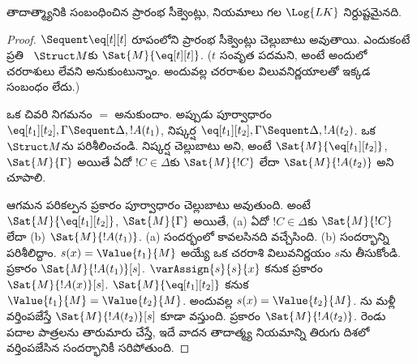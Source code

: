\documentclass[../../../include/open-logic-section]{subfiles}
\begin{document}


\begin{prop}
తాదాత్మ్యానికి సంబంధించిన ప్రారంభ సీక్వెంట్లు, నియమాలు గల $\Log{LK}$ నిర్దుష్టమైనది.
\end{prop}

\begin{proof}
${} \Sequent \eq[t][t]$ రూపంలోని ప్రారంభ సీక్వెంట్లు చెల్లుబాటు
అవుతాయి. ఎందుకంటే ప్రతి ~$\Struct M$కు
$\Sat{M}{\eq[t][t]}$. ($t$ సంవృత పదమని, అంటే అందులో చరరాశులు లేవని
అనుకుంటున్నాం. అందువల్ల చరరాశుల విలువనిర్ణయాలతో ఇక్కడ సంబంధం లేదు.)

ఒక  చివరి నిగమనం $=$ అనుకుందాం. అప్పుడు పూర్వాధారం
$\eq[t_1][t_2], \Gamma \Sequent \Delta, !A(t_1)$, నిష్కర్ష
$\eq[t_1][t_2], \Gamma \Sequent \Delta, !A(t_2)$. ఒక
~$\Struct M$ను పరిశీలించండి. నిష్కర్ష చెల్లుబాటు అని,
అంటే $\Sat{M}{\eq[t_1][t_2]}$, $\Sat{M}{\Gamma}$ అయితే ఏదో
$!C \in \Delta$కు $\Sat{M}{!C}$ లేదా $\Sat{M}{!A(t_2)}$ అని
చూపాలి.

ఆగమన పరికల్పన ప్రకారం పూర్వాధారం చెల్లుబాటు అవుతుంది. అంటే
$\Sat{M}{\eq[t_1][t_2]}$, $\Sat{M}{\Gamma}$ అయితే, (a) ఏదో
$!C \in \Delta$కు $\Sat{M}{!C}$ లేదా (b) $\Sat{M}{!A(t_1)}$.
(a) సందర్భంలో కావలసినది వచ్చేసింది. (b) సందర్భాన్ని పరిశీలిద్దాం.
$s(x) = \Value{t_1}{M}$ అయ్యే ఒక చరరాశి విలువనిర్ణయం $s$ను తీసుకోండి.
 ప్రకారం
$\Sat{M}{!A(t_1)}[s]$. $\varAssign{s}{s}{x}$ కనుక
 ప్రకారం $\Sat{M}{!A(x)}[s]$.
$\Sat{M}{\eq[t_1][t_2]}$ కనుక
$\Value{t_1}{M} = \Value{t_2}{M}$. అందువల్ల
$s(x) = \Value{t_2}{M}$. ను మళ్లీ
వర్తింపజేస్తే $\Sat{M}{!A(t_2)}[s]$ కూడా వస్తుంది.
 ప్రకారం $\Sat{M}{!A(t_2)}$. రెండు పదాల పాత్రలను తారుమారు చేస్తే, ఇదే వాదన తాదాత్మ్య నియమాన్ని తిరుగు దిశలో వర్తింపజేసిన సందర్భానికీ సరిపోతుంది.
\end{proof}
\end{document}
